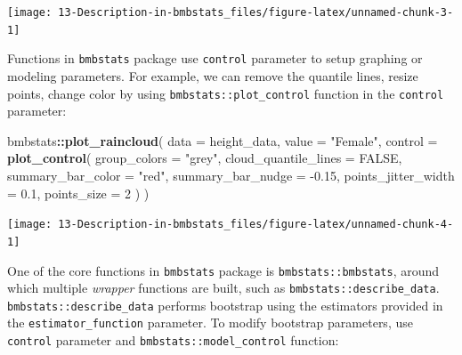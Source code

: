 \documentclass[
]{book}
\newenvironment{Shaded}{\begin{snugshade}}{\end{snugshade}}
\newcommand{\DataTypeTok}[1]{\textcolor[rgb]{0.13,0.29,0.53}{#1}}
\newcommand{\DecValTok}[1]{\textcolor[rgb]{0.00,0.00,0.81}{#1}}
\newcommand{\FloatTok}[1]{\textcolor[rgb]{0.00,0.00,0.81}{#1}}
\newcommand{\KeywordTok}[1]{\textcolor[rgb]{0.13,0.29,0.53}{\textbf{#1}}}
\newcommand{\NormalTok}[1]{#1}
\newcommand{\OperatorTok}[1]{\textcolor[rgb]{0.81,0.36,0.00}{\textbf{#1}}}
\newcommand{\OtherTok}[1]{\textcolor[rgb]{0.56,0.35,0.01}{#1}}
\newcommand{\StringTok}[1]{\textcolor[rgb]{0.31,0.60,0.02}{#1}}
\begin{document}
\begin{center}\texttt{[image: 13-Description-in-bmbstats\_files/figure-latex/unnamed-chunk-3-1]} \end{center}

Functions in \texttt{bmbstats} package use \texttt{control} parameter to setup graphing or modeling parameters. For example, we can remove the quantile lines, resize points, change color by using \texttt{bmbstats::plot\_control} function in the \texttt{control} parameter:

\begin{Shaded}
\begin{Highlighting}[]
\NormalTok{bmbstats}\OperatorTok{::}\KeywordTok{plot\_raincloud}\NormalTok{(}
  \DataTypeTok{data =}\NormalTok{ height\_data,}
  \DataTypeTok{value =} \StringTok{"Female"}\NormalTok{,}
  \DataTypeTok{control =} \KeywordTok{plot\_control}\NormalTok{(}
    \DataTypeTok{group\_colors =} \StringTok{"grey"}\NormalTok{,}
    \DataTypeTok{cloud\_quantile\_lines =} \OtherTok{FALSE}\NormalTok{,}
    \DataTypeTok{summary\_bar\_color =} \StringTok{"red"}\NormalTok{,}
    \DataTypeTok{summary\_bar\_nudge =} \FloatTok{{-}0.15}\NormalTok{,}
    \DataTypeTok{points\_jitter\_width =} \FloatTok{0.1}\NormalTok{,}
    \DataTypeTok{points\_size =} \DecValTok{2}
\NormalTok{  )}
\NormalTok{)}
\end{Highlighting}
\end{Shaded}

\begin{center}\texttt{[image: 13-Description-in-bmbstats\_files/figure-latex/unnamed-chunk-4-1]} \end{center}

One of the core functions in \texttt{bmbstats} package is \texttt{bmbstats::bmbstats}, around which multiple \emph{wrapper} functions are built, such as \texttt{bmbstats::describe\_data}. \texttt{bmbstats::describe\_data} performs bootstrap using the estimators provided in the \texttt{estimator\_function} parameter. To modify bootstrap parameters, use \texttt{control} parameter and \texttt{bmbstats::model\_control} function:
\end{document}
